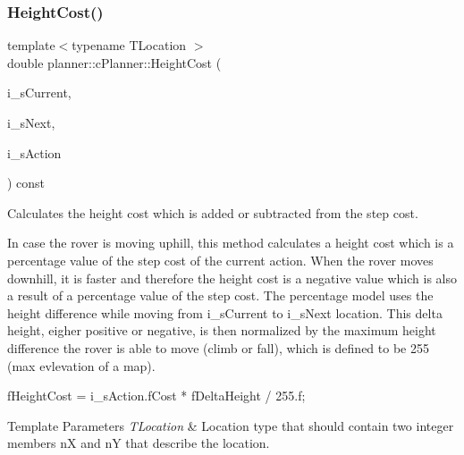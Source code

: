 \mbox{\label{classplanner_1_1c_planner_a9d57a0697bb0e4666f4fd45f77c4a1aa}} 
\subsubsection{\texorpdfstring{Height\+Cost()}{HeightCost()}}
{\footnotesize\ttfamily template$<$typename T\+Location $>$ \\
double planner\+::c\+Planner\+::\+Height\+Cost (\begin{DoxyParamCaption}\item[{T\+Location \&}]{i\+\_\+s\+Current,  }\item[{T\+Location \&}]{i\+\_\+s\+Next,  }\item[{\mbox{\hyperlink{structplanner_1_1t_action}{t\+Action}} \&}]{i\+\_\+s\+Action }\end{DoxyParamCaption}) const\hspace{0.3cm}{\ttfamily [inline]}}



Calculates the height cost which is added or subtracted from the step cost. 

In case the rover is moving uphill, this method calculates a height cost which is a percentage value of the step cost of the current action. When the rover moves downhill, it is faster and therefore the height cost is a negative value which is also a result of a percentage value of the step cost. The percentage model uses the height difference while moving from i\+\_\+s\+Current to i\+\_\+s\+Next location. This delta height, eigher positive or negative, is then normalized by the maximum height difference the rover is able to move (climb or fall), which is defined to be 255 (max evlevation of a map). 
\begin{DoxyCode}
fHeightCost = i\_sAction.fCost * fDeltaHeight / 255.f;
\end{DoxyCode}



\begin{DoxyTemplParams}{Template Parameters}
{\em T\+Location} & Location type that should contain two integer members nX and nY that describe the location. \\
\hline
\end{DoxyTemplParams}

